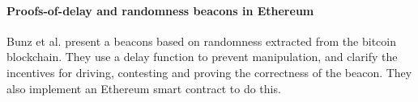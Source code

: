 \paragraph{Proofs-of-delay and randomness beacons in Ethereum}
Bunz et al. \cite{bunz2017proofsof} present a beacons based on randomness extracted from the bitcoin blockchain. They use a delay function to prevent manipulation, and clarify the incentives for driving, contesting and proving the correctness of the beacon. They also implement an Ethereum smart contract to do this.